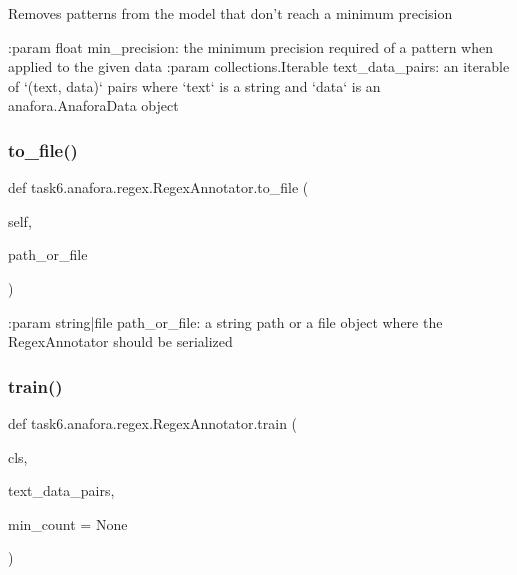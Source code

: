 \begin{DoxyVerb}Removes patterns from the model that don't reach a minimum precision

:param float min_precision: the minimum precision required of a pattern when applied to the given data
:param collections.Iterable text_data_pairs: an iterable of `(text, data)` pairs where `text` is a string and
    `data` is an anafora.AnaforaData object
\end{DoxyVerb}
 \mbox{\label{classtask6_1_1anafora_1_1regex_1_1RegexAnnotator_a6a39226ac10e1f494d4d4b5073f10d15}} 
\subsubsection{\texorpdfstring{to\+\_\+file()}{to\_file()}}
{\footnotesize\ttfamily def task6.\+anafora.\+regex.\+Regex\+Annotator.\+to\+\_\+file (\begin{DoxyParamCaption}\item[{}]{self,  }\item[{}]{path\+\_\+or\+\_\+file }\end{DoxyParamCaption})}

\begin{DoxyVerb}:param string|file path_or_file: a string path or a file object where the RegexAnnotator should be serialized
\end{DoxyVerb}
 \mbox{\label{classtask6_1_1anafora_1_1regex_1_1RegexAnnotator_ad0474bb10d3386a3e8cdc34618d4af9e}} 
\subsubsection{\texorpdfstring{train()}{train()}}
{\footnotesize\ttfamily def task6.\+anafora.\+regex.\+Regex\+Annotator.\+train (\begin{DoxyParamCaption}\item[{}]{cls,  }\item[{}]{text\+\_\+data\+\_\+pairs,  }\item[{}]{min\+\_\+count = {\ttfamily None} }\end{DoxyParamCaption})}

